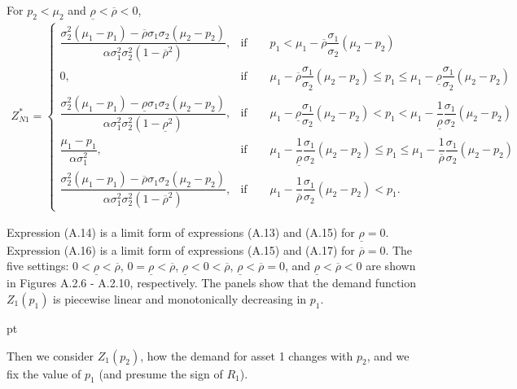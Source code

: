 \documentclass[10pt]{article}
\begin{document}
For $ p_2 < \mu_2 $ and $ \underline{\rho} < \overline{\rho} < 0 $,
{\footnotesize \begin{eqnarray}
Z_{N 1}^* = \left\{ \begin{matrix}
\dfrac{\sigma_2^2 (\mu_1 - p_1) - \overline{\rho} \sigma_1 \sigma_2 (\mu_2 - p_2)}{\alpha \sigma_1^2 \sigma_2^2 (1 - \overline{\rho}^2)}, & \text{if} \qquad p_1 < \mu_1 - \overline{\rho} \dfrac{\sigma_1}{\sigma_2} (\mu_2 - p_2) \\
0, & \text{if} \qquad \mu_1 - \overline{\rho} \dfrac{\sigma_1}{\sigma_2} (\mu_2 - p_2) \leqslant p_1 \leqslant \mu_1 - \underline{\rho} \dfrac{\sigma_1}{\sigma_2} (\mu_2 - p_2) \\
\dfrac{\sigma_2^2 (\mu_1 - p_1) - \underline{\rho} \sigma_1 \sigma_2 (\mu_2 - p_2)}{\alpha \sigma_1^2 \sigma_2^2 (1 - \underline{\rho}^2)}, & \text{if} \qquad \mu_1 - \underline{\rho} \dfrac{\sigma_1}{\sigma_2} (\mu_2 - p_2) < p_1 < \mu_1 - \dfrac1{\underline{\rho}} \dfrac{\sigma_1}{\sigma_2} (\mu_2 - p_2) \\
\dfrac{\mu_1 - p_1}{\alpha \sigma_1^2}, & \text{if} \qquad \mu_1 - \dfrac1{\underline{\rho}} \dfrac{\sigma_1}{\sigma_2} (\mu_2 - p_2) \leqslant p_1 \leqslant \mu_1 - \dfrac1{\overline{\rho}} \dfrac{\sigma_1}{\sigma_2} (\mu_2 - p_2) \\
\dfrac{\sigma_2^2 (\mu_1 - p_1) - \overline{\rho} \sigma_1 \sigma_2 (\mu_2 - p_2)}{\alpha \sigma_1^2 \sigma_2^2 (1 - \overline{\rho}^2)}, & \text{if} \qquad \mu_1 - \dfrac1{\overline{\rho}} \dfrac{\sigma_1}{\sigma_2} (\mu_2 - p_2) < p_1.
\end{matrix} \right.
\end{eqnarray}}

Expression (A.14) is a limit form of expressions (A.13) and (A.15) for $ \underline{\rho} = 0 $.
Expression (A.16) is a limit form of expressions (A.15) and (A.17) for $ \overline{\rho} = 0 $.
The five settings: $ 0 < \underline{\rho} < \overline{\rho} $, $ 0 = \underline{\rho} < \overline{\rho} $, $ \underline{\rho} < 0 < \overline{\rho} $, $ \underline{\rho} < \overline{\rho} = 0 $, and $ \underline{\rho} < \overline{\rho} < 0 $ are shown in Figures A.2.6 - A.2.10, respectively. The panels show that the demand function $ Z_1 (p_1) $ is piecewise linear and monotonically decreasing in $ p_1 $.

 pt

Then we consider $ Z_1 (p_2) $, how the demand for asset 1 changes with $ p_2 $, and we fix the value of $ p_1 $ (and presume the sign of $ R_1 $).
\end{document}
